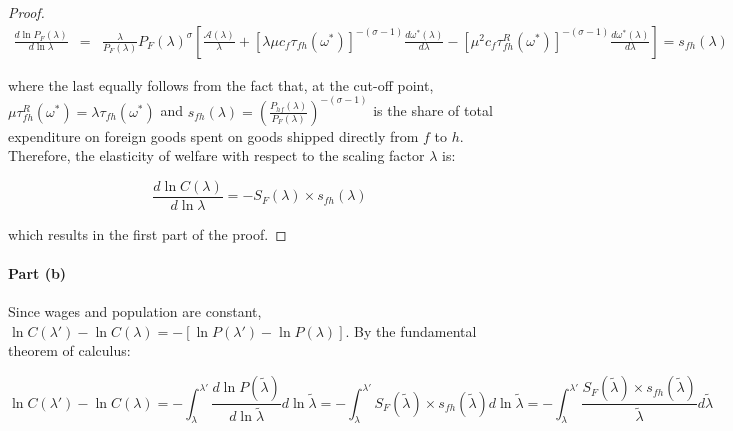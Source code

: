 \begin{proof}
\begin{eqnarray*}
    \frac{d \ln P_F(\lambda)}{d \ln\lambda} &=& \frac{\lambda}{P_F(\lambda)} P_F(\lambda)^{\sigma} \left[ \frac{\mathcal{A(\lambda)}}{\lambda} + [\lambda \mu c_f \tau_{fh}(\omega^*)]^{-(\sigma-1)}  \frac{d\omega^*(\lambda)}{d \lambda} - [\mu^2 c_f \tau^R_{fh}(\omega^*)]^{-(\sigma-1)}  \frac{d\omega^*(\lambda)}{d \lambda} \right] = s_{fh}(\lambda)
\end{eqnarray*}

\noindent where the last equally follows from the fact that, at the cut-off point, $\mu \tau^R_{fh}(\omega^*) = \lambda \tau_{fh}(\omega^*)$ and $s_{fh}(\lambda) = \left( \frac{P_{hf}(\lambda)}{P_F(\lambda)} \right)^{-(\sigma-1)}$ is the share of total expenditure on foreign goods spent on goods shipped directly from $f$ to $h$. Therefore, the elasticity of welfare with respect to the scaling factor $\lambda$ is:

\begin{equation}
    \frac{d \ln C(\lambda)}{d\ln \lambda} = - S_F(\lambda) \times s_{fh}(\lambda)
\end{equation}

\noindent which results in the first part of the proof.
\end{proof}

\paragraph{Part (b)} Since wages and population are constant,  $\ln C(\lambda') - \ln C(\lambda) =  -[\ln P(\lambda') - \ln P(\lambda)]$. By the fundamental theorem of calculus:

\begin{equation*}
    \ln C(\lambda') - \ln C(\lambda) =  -\int_\lambda^{\lambda'} \frac{d \ln P(\tilde{\lambda})}{d \ln \tilde{\lambda}} d \ln \tilde{\lambda} = - \int_\lambda^{\lambda'} S_F(\tilde{\lambda}) \times s_{fh}(\tilde{\lambda})   d \ln \tilde{\lambda} = - \int_\lambda^{\lambda'} \frac{S_F(\tilde{\lambda}) \times s_{fh}(\tilde{\lambda})}{\tilde{\lambda}}   d \tilde{\lambda}   
\end{equation*}

